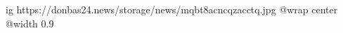  
 
 
 
 

\ifcmt
  ig https://donbas24.news/storage/news/mqbt8acncqzacctq.jpg
  @wrap center
  @width 0.9
\fi
